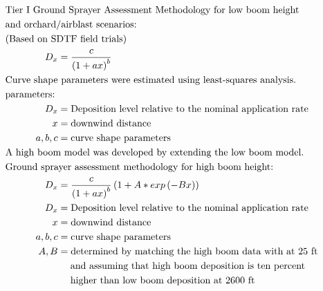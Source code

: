 \documentclass[10pt]{article}
\begin{document}
\begin{align*}
& \hspace{-0.75in}  \text{Tier I Ground Sprayer Assessment Methodology for low boom height} \nonumber \\  & \hspace{-0.75in} \text{and orchard/airblast scenarios:}\nonumber \\
& \hspace{-0.75in}  \text{(Based on SDTF field trials)} \nonumber \\
D_{x} & = \frac{c}{\left(1+ax\right)^{b}} \nonumber \\
&    \hspace{-.75in}  \text{Curve shape parameters were estimated using least-squares analysis.} \nonumber \\
&    \hspace{-.75in}  \text{parameters:} \nonumber \\
D_{x} & = \text{Deposition level relative to the nominal application rate} \nonumber \\
x & = \text{downwind distance} \nonumber \\
a,b,c & = \text{curve shape parameters} \nonumber \\
& \hspace{-0.75in}  \text{A high boom model was developed by extending the low boom model.} \nonumber \\
& \hspace{-0.75in}  \text{Ground sprayer assessment methodology for high boom height:} \nonumber \\
D_{x} & = \frac{c}{\left(1+ax\right)^{b}}\left(1 + A * exp\left( -Bx\right)\right) \nonumber \\
D_{x} & = \text{Deposition level relative to the nominal application rate} \nonumber \\
x & = \text{downwind distance} \nonumber \\
a,b,c & = \text{curve shape parameters} \nonumber \\
A, B & = \text{determined by matching the high boom data with at 25 ft} \nonumber \\ &\hspace{1.3em} \text{and assuming that high boom deposition is ten percent} \nonumber\\&\hspace{1.3em}\text{higher than low boom deposition at 2600 ft} \nonumber \\
\end{align*} 
\end{document}
